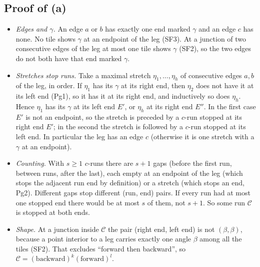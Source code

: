 \documentclass[11pt,reqno]{amsart}
\theoremstyle{plain}
\theoremstyle{definition}
\begin{document}
\subsection{Proof of (a)}
\begin{itemize}
\item[\textbf{Pg1}] \emph{Edges and $\gamma$.} An edge $a$ or $b$ has exactly one end marked $\gamma$ and an edge $c$ has none. No tile shows $\gamma$ at an endpoint of the leg (SF3). At a junction of two consecutive edges of the leg at most one tile shows $\gamma$ (SF2), so the two edges do not both have that end marked $\gamma$.
\item[\textbf{Pg2}] \emph{Stretches stop runs.} Take a maximal stretch $\eta_1,\dots,\eta_h$ of consecutive edges $a,b$ of the leg, in order. If $\eta_1$ has its $\gamma$ at its right end, then $\eta_2$ does not have it at its left end (Pg1), so it has it at its right end, and inductively so does $\eta_h$. Hence $\eta_1$ has its $\gamma$ at its left end $E'$, or $\eta_h$ at its right end $E''$. In the first case $E'$ is not an endpoint, so the stretch is preceded by a $c$-run stopped at its right end $E'$; in the second the stretch is followed by a $c$-run stopped at its left end. In particular the leg has an edge $c$ (otherwise it is one stretch with a $\gamma$ at an endpoint).
\item[\textbf{Pg3}] \emph{Counting.} With $s\ge1$ $c$-runs there are $s+1$ gaps (before the first run, between runs, after the last), each empty at an endpoint of the leg (which stops the adjacent run end by definition) or a stretch (which stops an end, Pg2). Different gaps stop different (run, end) pairs. If every run had at most one stopped end there would be at most $s$ of them, not $s+1$. So some run $\mathcal C$ is stopped at both ends.
\item[\textbf{Pg4}] \emph{Shape.} At a junction inside $\mathcal C$ the pair (right end, left end) is not $(\beta,\beta)$, because a point interior to a leg carries exactly one angle $\beta$ among all the tiles (SF2). That excludes ``forward then backward'', so $\mathcal C=(\text{backward})^k(\text{forward})^l$.
\end{itemize}
\end{document}
